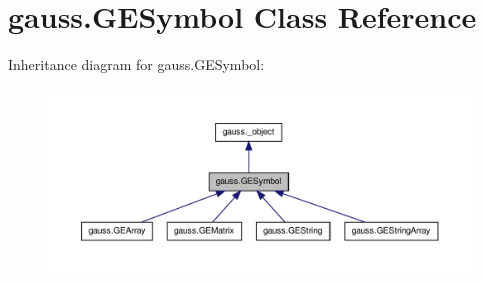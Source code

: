 \hypertarget{classgauss_1_1_g_e_symbol}{\section{gauss.\-G\-E\-Symbol Class Reference}
\label{classgauss_1_1_g_e_symbol}
}


Inheritance diagram for gauss.\-G\-E\-Symbol\-:\nopagebreak
\begin{figure}[H]
\begin{center}
\leavevmode
\includegraphics[width=350pt]{classgauss_1_1_g_e_symbol__inherit__graph}
\end{center}
\end{figure}
